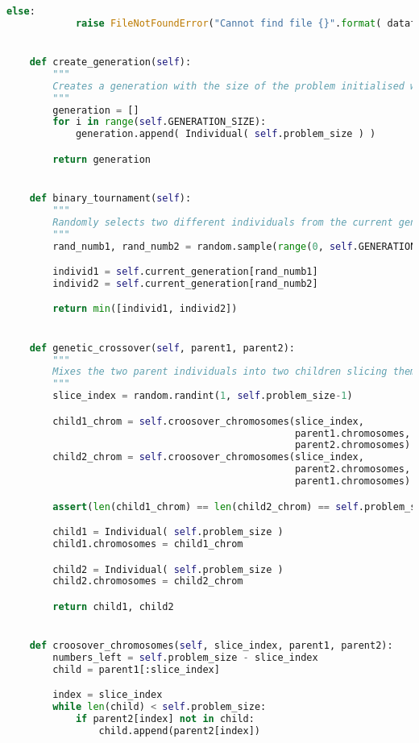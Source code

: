 \begin{lstlisting}[language=python]
        else:
            raise FileNotFoundError("Cannot find file {}".format( datafile ))


    def create_generation(self):
        """
        Creates a generation with the size of the problem initialised with random individuals
        """
        generation = []
        for i in range(self.GENERATION_SIZE):
            generation.append( Individual( self.problem_size ) )

        return generation


    def binary_tournament(self):
        """
        Randomly selects two different individuals from the current generation and returns the optimal one
        """
        rand_numb1, rand_numb2 = random.sample(range(0, self.GENERATION_SIZE), 2)

        individ1 = self.current_generation[rand_numb1]
        individ2 = self.current_generation[rand_numb2]

        return min([individ1, individ2])


    def genetic_crossover(self, parent1, parent2):
        """
        Mixes the two parent individuals into two children slicing them by a random index and avoiding repeating chromosomes in each child
        """
        slice_index = random.randint(1, self.problem_size-1)

        child1_chrom = self.croosover_chromosomes(slice_index,
                                                  parent1.chromosomes,
                                                  parent2.chromosomes)
        child2_chrom = self.croosover_chromosomes(slice_index,
                                                  parent2.chromosomes,
                                                  parent1.chromosomes)

        assert(len(child1_chrom) == len(child2_chrom) == self.problem_size)

        child1 = Individual( self.problem_size )
        child1.chromosomes = child1_chrom

        child2 = Individual( self.problem_size )
        child2.chromosomes = child2_chrom

        return child1, child2


    def croosover_chromosomes(self, slice_index, parent1, parent2):
        numbers_left = self.problem_size - slice_index
        child = parent1[:slice_index]

        index = slice_index
        while len(child) < self.problem_size:
            if parent2[index] not in child:
                child.append(parent2[index])


\end{lstlisting}

